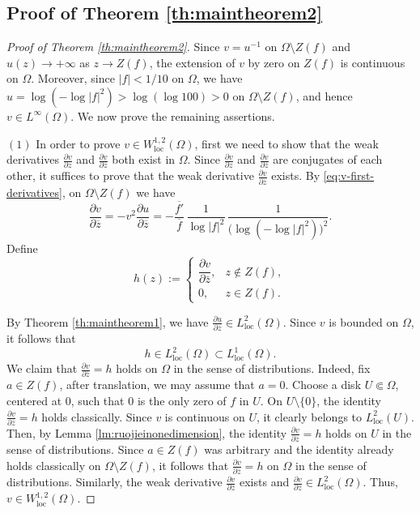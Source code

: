\documentclass[12pt,twoside]{amsart}
\numberwithin{equation}{section}
\numberwithin{definition}{section} %
\begin{document}
\subsection{Proof of Theorem \ref{th:maintheorem2}}






\begin{proof}[Proof of Theorem \ref{th:maintheorem2}]

Since $v=u^{-1}$ on $\Omega\setminus Z(f)$ and \(u(z)\to+\infty\) as \(z\to Z(f)\), the extension of $v$ by zero on $Z(f)$ is continuous on $\Omega$.
Moreover, since $|f|<1/10$ on $\Omega$, we have
$
u=\log(-\log|f|^2)>\log(\log 100)>0
$
on $\Omega\setminus Z(f)$, and hence $v\in L^\infty(\Omega)$.
We now prove the remaining assertions.

$(1)$  In order to prove $v\in W^{1,2}_{\mathrm{loc}}(\Omega)$,  first we need to show that the weak derivatives $\frac{\partial v}{\partial z}$ and $\frac{\partial v}{\partial \overline{z}}$ both exist in $\Omega$.  Since $\frac{\partial v}{\partial z}$ and $\frac{\partial v}{\partial \overline{z}}$ are conjugates of each other,  it suffices to prove that the weak derivative $\frac{\partial v}{\partial \overline{z}}$ exists. By \eqref{eq:v-first-derivatives}, on $\Omega\setminus Z(f)$ we have
\[
\frac{\partial v}{\partial \overline{z}}
=
-{v^2}\frac{\partial u}{\partial \overline{z}}
=
-\frac{\overline{f'}}{\overline{f}}\,
\frac{1}{\log |f|^2}\,
\frac{1}{\bigl(\log(-\log |f|^2)\bigr)^2}.
\]
Define
\[
h(z):=
\begin{cases}
\dfrac{\partial v}{\partial\bar z}, & z\notin Z(f),\\[4pt]
0, & z\in Z(f).
\end{cases}
\]

By Theorem \ref{th:maintheorem1}, we have
$
\frac{\partial u}{\partial \overline{z}}
\in L_{\mathrm{loc}}^2(\Omega).
$
Since \(v\) is bounded on \(\Omega\), it follows that
\[
h\in L_{\mathrm{loc}}^2(\Omega)
\subset L_{\mathrm{loc}}^1(\Omega).
\]
We claim that
$\frac{\partial v}{\partial \overline{z}}=h$ holds on $\Omega$ in the sense of distributions. Indeed, fix \(a\in Z(f)\), after translation, we may assume that $a = 0$. Choose a disk \(U\Subset\Omega\), centered at \(0\), such that \(0\) is the only zero of
\(f\) in \(U\). On \(U\setminus\{0\}\), the identity
$
\frac{\partial v}{\partial\bar z}=h
$
holds classically. Since $v$ is continuous on $U$, it clearly belongs to $L^2_{\mathrm{loc}}(U)$. Then, by Lemma \ref{lm:ruojieinonedimension}, the identity $\frac{\partial v} {\partial \overline{z}}=h$ holds on $U$ in the sense of distributions.  Since $a\in Z(f)$ was arbitrary and the identity already holds classically on $\Omega\setminus Z(f)$, it follows that
$\frac{\partial v}{\partial\bar z}=h$ on $\Omega$ in the sense of distributions.  Similarly, the weak derivative $ \frac{ \partial v} {\partial z} $ exists and $ \frac{ \partial v} {\partial z}\in L^2_{\mathrm{loc}}(\Omega)$.  Thus, $v\in W^{1,2}_{\mathrm{loc}}(\Omega)$.


\end{proof}
\end{document}
